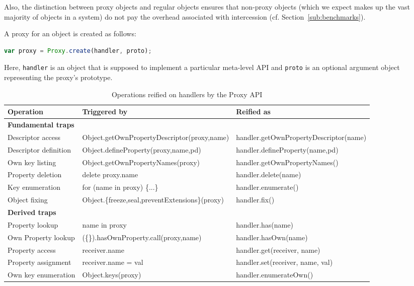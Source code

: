 \documentclass{acm_proc_article-sp}
\begin{document}
Also, the distinction between proxy objects and regular objects ensures that non-proxy objects (which we expect makes up the vast majority of objects in a system) do not pay the overhead associated with intercession (cf. Section~\ref{sub:benchmarks}).

A proxy for an object is created as follows:

\begin{lstlisting}[language=javascript]
var proxy = Proxy.create(handler, proto);
\end{lstlisting}

Here, \texttt{handler} is an object that is supposed to implement a particular meta-level API and \texttt{proto} is an optional argument object representing the proxy's prototype.

\begin{table}[t]
  \begin{center}
    \begin{small}
    \begin{tabular}{|l|p{}|p{}|}
    \hline
    \textbf{Operation} & \textbf{Triggered by} & \textbf{Reified as}\\
    \hline
    \multicolumn{3}{|l|}{\textbf{Fundamental traps}}\\
    \hline
    Descriptor access & Object.getOwnPropertyDescriptor(proxy,name) & handler.getOwnPropertyDescriptor(name)\\
    \hline
    Descriptor definition & Object.defineProperty(proxy,name,pd) & handler.defineProperty(name,pd)\\
    \hline
    Own key listing & Object.getOwnPropertyNames(proxy) & handler.getOwnPropertyNames()\\
    \hline
    Property deletion & delete proxy.name & handler.delete(name)\\
    \hline
    Key enumeration & for (name in proxy) \{...\} & handler.enumerate()\\
    \hline
    Object fixing & Object.\{freeze,seal,preventExtensions\}(proxy) & handler.fix()\\
    \hline
    \multicolumn{3}{|l|}{\textbf{Derived traps}}\\
    \hline
    Property lookup & name in proxy & handler.has(name)\\
    \hline
    Own Property lookup & (\{\}).hasOwnProperty.call(proxy,name) & handler.hasOwn(name)\\
    \hline
    Property access & receiver.name & handler.get(receiver, name)\\
    \hline
    Property assignment & receiver.name = val & handler.set(receiver, name, val)\\
    \hline
    Own key enumeration & Object.keys(proxy) & handler.enumerateOwn()\\
    \hline
    \end{tabular}
    \end{small}
  \end{center}
  \caption{Operations reified on handlers by the Proxy API}
  \label{tab:operations}
\end{table}
\end{document}
